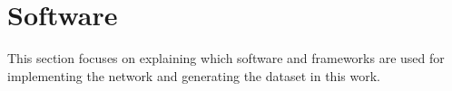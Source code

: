 \section{Software}
This section focuses on explaining which software and frameworks are used for implementing the network and generating the dataset in this work.


